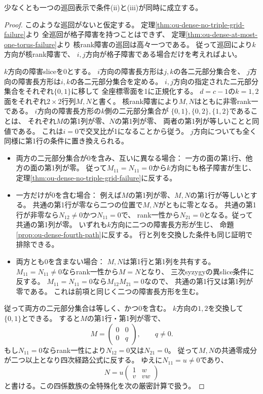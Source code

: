 \begin{theorem}[格子・核rank条件を同時に満たす巡回]
\label{thm:ou-dense-common-grid-torus}
少なくとも一つの巡回表示で条件(ii)と(iii)が同時に成立する。
\end{theorem}
\begin{proof}
このような巡回がないと仮定する。
定理\ref{thm:ou-dense-no-triple-grid-failure}より
全巡回が格子障害を持つことはできず、
定理\ref{thm:ou-dense-at-most-one-torus-failure}より
核rank障害の巡回は高々一つである。
従って巡回により$k$方向が核rank障害で、
$i,j$方向が格子障害である場合だけを考えればよい。

$k$方向の障害sliceを$0$とする。
$i$方向の障害長方形は$j,k$の各二元部分集合を、
$j$方向の障害長方形は$i,k$の各二元部分集合を定める。
$i,j$方向の指定された二元部分集合をそれぞれ$\{0,1\}$に移して
全座標零面を1に正規化する。
$d=c-1$の$k=1,2$面をそれぞれ$2\times2$行列$M,N$と書く。
核rank障害により$M,N$はともに非零rank一である。
$i$方向の障害長方形の$k$側の二元部分集合が
$\{0,1\},\{0,2\},\{1,2\}$であることは、
それぞれ$M$の第1列が零、$N$の第1列が零、
両者の第1列が等しいことと同値である。
これは$i=0$で交叉比が1になることから従う。
$j$方向についても全く同様に第1行の条件に置き換えられる。

\begin{itemize}
 \item 両方の二元部分集合が0を含み、互いに異なる場合：
 一方の面の第1行、他方の面の第1列が零。
 従って$M_{11}=N_{11}=0$から$k$方向にも格子障害が生じ、
 定理\ref{thm:ou-dense-no-triple-grid-failure}に反する。
 \item 一方だけが0を含む場合：
 例えば$M$の第1列が零、$M,N$の第1行が等しいとする。
 共通の第1行が零なら二つの位置で$M,N$がともに零となる。
 共通の第1行が非零なら$N_{12}\ne0$かつ$N_{11}=0$で、
 rank一性から$N_{21}=0$となる。従って共通の第1列が零。
 いずれも$k$方向に二つの障害長方形が生じ、
 命題\ref{prop:ou-dense-fourth-path}に反する。
 行と列を交換した条件も同じ証明で排除できる。
 \item 両方とも0を含まない場合：
 $M,N$は第1行と第1列を共有する。
 $M_{11}=N_{11}\ne0$ならrank一性から$M=N$となり、
 三次syzygyの異slice条件に反する。
 $M_{11}=N_{11}=0$なら$M_{12}M_{21}=0$なので、
 共通の第1行又は第1列が零である。
 これは前項と同じく二つの障害長方形を生む。
\end{itemize}

従って両方の二元部分集合は等しく、かつ0を含む。
$k$方向の$1,2$を交換して$\{0,1\}$とできる。
すると$M$の第1行・第1列が零で、
\[
 M=\begin{pmatrix}0&0\\0&q\end{pmatrix},\qquad q\ne0 .
\]
もし$N_{11}=0$ならrank一性により$N_{12}=0$又は$N_{21}=0$。
従って$M,N$の共通零成分が二つ以上となり四次経路公式に反する。
ゆえに$N_{11}=u\ne0$であり、
\[
 N=u\begin{pmatrix}1&w\\v&vw\end{pmatrix}
\]
と書ける。この四係数族の全特殊化を次の厳密計算で扱う。


\end{proof}
